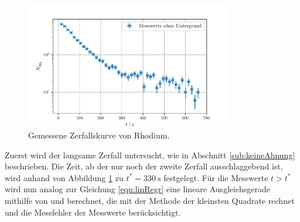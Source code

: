 \begin{figure}
    \centering
    \includegraphics[width=0.8\textwidth]{plots/Rhodium.pdf}
    \caption{Gemessene Zerfallskurve von Rhodium.}
    \label{fig:RhodiumMess}
\end{figure}
Zuerst wird der langsame Zerfall untersucht, wie in Abschnitt \ref{sub:keineAhnung} beschrieben. 
Die Zeit, ab der nur noch der zweite Zerfall ausschlaggebend ist, wird anhand von Abbildung \ref{fig:RhodiumMess} zu $t^*=\SI{330}{\second}$ festgelegt.
Für die Messwerte $t>t^*$ wird nun analog zur Gleichung \eqref{eqn:linRegr} eine lineare Ausgleichsgerade mithilfe von 
\cite{scipy} und \cite{uncertainties} berechnet, die mit der Methode der kleinsten Quadrate rechnet und die Messfehler der Messwerte berücksichtigt. 

